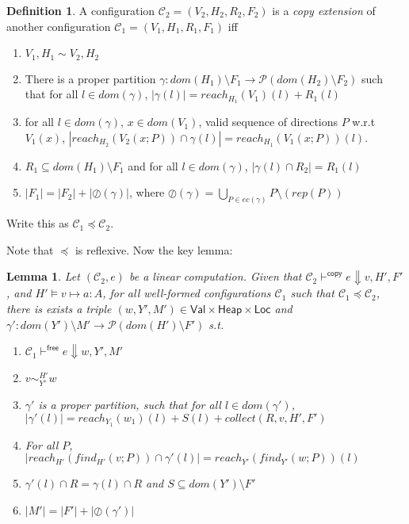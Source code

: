 \documentclass[11pt]{article}
\newcommand{\ms}[1]{\ensuremath{\mathsf{#1}}}
\newcommand{\veq}[4]{#3 \sim^{#1}_{#2} #4}
\newcommand{\oh}[1]{\oslash(#1)}
\newtheorem{lemma}[theorem]{Lemma}
\theoremstyle{definition}
\newtheorem{definition}{Definition}[section]
\begin{document}
\begin{definition}
A configuration $\mathcal{C}_2 = (V_2,H_2,R_2,F_2)$ is a \emph{copy extension} of another configuration
$\mathcal{C}_1 = (V_1,H_1,R_1,F_1)$ iff
\begin{enumerate}
\item $V_1,H_1 \sim V_2,H_2$
\item There is a proper partition $\gamma : dom(H_1) \setminus F_1 \to \mathcal{P}(dom(H_2) \setminus F_2)$ 
such that for all $l \in dom(\gamma)$, $|\gamma(l)| = reach_{H_1}(V_1)(l) + R_1(l)$
\item for all $l \in dom(\gamma)$, $x \in dom(V_1)$, valid sequence of directions $P$ w.r.t $V_1(x)$,
	$|reach_{H_2}(V_2(x;P)) \cap \gamma(l)| = reach_{H_1}(V_1(x;P))(l)$.
\item $R_1 \subseteq dom(H_1) \setminus F_1$ and 
	for all $l \in dom(\gamma)$, $|\gamma(l) \cap R_2| = R_1(l)$
\item $|F_1| = |F_2| + |\oh{\gamma}|$, where 
	$\oh{\gamma} = \bigcup_{P \in ec(\gamma)} P \setminus (rep(P))$
\end{enumerate}
Write this as $\mathcal{C}_1 \preceq \mathcal{C}_2$.
\end{definition} 

Note that $\preceq$ is reflexive. Now the key lemma:

\begin{lemma}
	Let $(\mathcal{C}_2,e)$ be a linear computation. Given that 
	$\mathcal{C}_2 \vdash^{\mathsf{copy}} e \Downarrow v,H',F'$, and $H' \vDash v \mapsto a : A$, 
	for all well-formed configurations $\mathcal{C}_1$ such that $\mathcal{C}_1 \preceq \mathcal{C}_2$,
there is exists a triple
$(w,Y',M') \in \ms{Val} \times \ms{Heap} \times \ms{Loc}$ and 
	$\gamma' : dom(Y') \setminus M' \to \mathcal{P}(dom(H') \setminus F')$ s.t.
	\begin{enumerate}
			\item $\mathcal{C}_1 \vdash^{\mathsf{free}} e \Downarrow w,Y',M'$
			\item $\veq{H'}{Y'}{v}{w}$
			\item $\gamma'$ is a proper partition, such that for all $l \in dom(\gamma')$, 
				$|\gamma'(l)| = reach_{Y_1}(w_1)(l) + S(l) + collect(R,v,H',F')$
			\item For all $P$, $|reach_{H'}(find_{H'}(v;P)) \cap \gamma'(l)| = 
				reach_{Y'}(find_{Y'}(w;P))(l)$
			\item $\gamma'(l) \cap R = \gamma(l) \cap R$ and $S \subseteq dom(Y') \setminus F'$
			\item $|M'| = |F'| + |\oh{\gamma'}|$
	\end{enumerate}
\end{lemma}
\end{document}
